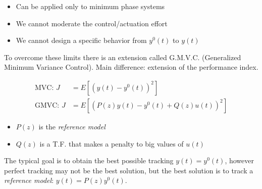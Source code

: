 \begin{itemize}
    \item Can be applied only to minimum phase systems
    \item We cannot moderate the control/actuation effort
    \item We cannot design a specific behavior from $y^0(t)$ to $y(t)$
\end{itemize}

To overcome these limits there is an extension called G.M.V.C. (Generalized Minimum Variance Control).
Main difference: extension of the performance index.

\begin{align*}
    \text{MVC: } J &= E\left[ \left(y(t) - y^0(t)\right)^2 \right] \\
    \text{GMVC: } J &= E\left[ \left(P(z)y(t) - y^0(t) + Q(z)u(t)\right)^2 \right]
\end{align*}
\begin{itemize}
    \item $P(z)$ is the \emph{reference model}
    \item $Q(z)$ is a T.F. that makes a penalty to big values of $u(t)$
\end{itemize}

\begin{remark}
    \begin{figure}[H]
        \centering
    \end{figure}

    The typical goal is to obtain the best possible tracking $y(t) = y^0(t)$, however perfect tracking may not be the best solution, but the best solution is to track a \emph{reference model}: $y(t) = P(z)y^0(t)$.
\end{remark}

